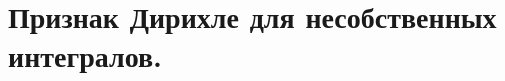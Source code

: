 \documentclass[../main.tex]{subfiles}
\begin{document}
\newpage
\section{Признак Дирихле для несобственных интегралов.}
\end{document}
